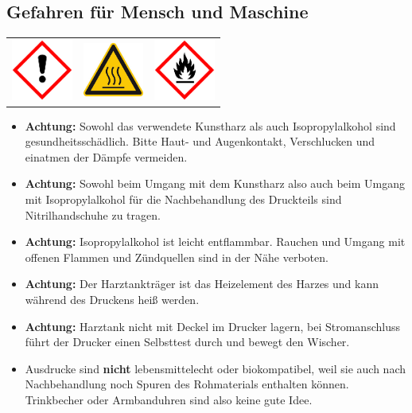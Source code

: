 \documentclass{\basedir/fablab-document}
\begin{document}
\subsection{Gefahren für Mensch und Maschine}
\begin{table}[h]
    \centering
    \begin{tabular}{ccc}

        \includegraphics[width=2cm]{bilder/GHSa.png}  &
        \includegraphics[width=2cm]{bilder/GHShs.jpg}  & \includegraphics[width=2cm]{bilder/GHSf.png}
    \end{tabular}
\end{table}

\begin{itemize}
    \item \textbf{Achtung:} Sowohl das verwendete Kunstharz als auch Isopropylalkohol sind gesundheitsschädlich. Bitte Haut- und Augenkontakt, Verschlucken und einatmen der Dämpfe vermeiden.
    \item \textbf{Achtung:} Sowohl beim Umgang mit dem Kunstharz also auch beim Umgang mit Isopropylalkohol für die Nachbehandlung des Druckteils sind Nitrilhandschuhe zu tragen.
    \item \textbf{Achtung:} Isopropylalkohol ist leicht entflammbar. Rauchen und Umgang mit offenen Flammen und Zündquellen sind in der Nähe verboten.
    \item \textbf{Achtung:} Der Harztankträger ist das Heizelement des Harzes und kann während des Druckens heiß werden.
    \item \textbf{Achtung:} Harztank nicht mit Deckel im Drucker lagern, bei Stromanschluss führt der Drucker einen Selbsttest durch und bewegt den Wischer.
    \item Ausdrucke sind \textbf{nicht} lebensmittelecht oder biokompatibel, weil sie  auch nach Nachbehandlung noch Spuren des Rohmaterials enthalten können. Trinkbecher oder Armbanduhren sind also keine gute Idee.
\end{itemize}
\end{document}
